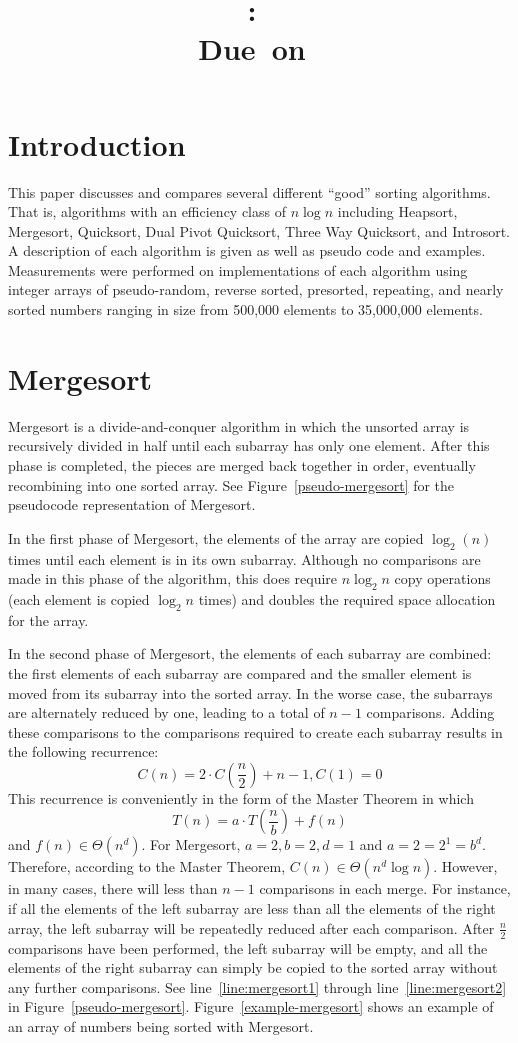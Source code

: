 \documentclass{article}
\title{
    \vspace{2in}
    \textmd{\textbf{\hmwkClass:\ \hmwkTitle}}\\
    \normalsize\vspace{0.1in}\small{Due\ on\ \hmwkDueDate}\\
    \vspace{0.1in}\large{\textit{\hmwkClassInstructor}}
    \vspace{3in}
}
\author{\textbf{\hmwkAuthorName}}
\begin{document}
\section{Introduction}
This paper discusses and compares several different ``good'' sorting
algorithms. That is, algorithms with an efficiency class of $n\log n$
including Heapsort, Mergesort, Quicksort, Dual Pivot Quicksort,
Three Way Quicksort, and Introsort. A description of each algorithm is
given as well as pseudo code and examples. Measurements were performed
on implementations of each algorithm using integer arrays of pseudo-random,
reverse sorted, presorted, repeating, and nearly sorted numbers ranging
in size from 500,000 elements to 35,000,000 elements.

\section{Mergesort}
Mergesort is a divide-and-conquer algorithm in which the unsorted array is recursively divided
in half until each subarray has only one element. After this phase is completed, the pieces are 
merged back together in order, eventually recombining into one sorted array. See 
Figure~\ref{pseudo-mergesort} for the pseudocode representation of Mergesort.

In the first phase of Mergesort, the elements of the array are copied $\log_2(n)$ times until each 
element is in its own subarray. Although no comparisons are made in this phase of the algorithm,
this does require $n\log_2 n$ copy operations (each element is copied $\log_2n$ times) 
and doubles the required space allocation for the array.

In the second phase of Mergesort, the elements of each subarray are combined: the first elements of each subarray are compared and the smaller element is moved from its subarray into the sorted array. In the worse case, the subarrays are alternately reduced by one, leading to a total of $n-1$
comparisons. Adding these comparisons to the comparisons required to create each subarray 
results in the following recurrence:
\[
	C(n) = 2 \cdot C\left(\frac{n}{2}\right) + n-1, C(1) = 0
\]
This recurrence is conveniently in the form of the Master Theorem in which
\[
	T(n) = a \cdot T\left(\frac{n}{b}\right) +f(n)
\]
and $f(n) \in \Theta(n^d)$. For Mergesort, $a = 2, b = 2, d = 1$ and $a = 2 = 2^1 = b^d$. 
Therefore, according to the Master Theorem, $C(n) \in \Theta(n^d \log n)$. However, in many
cases, there will less than $n-1$ comparisons in each merge. For instance, if
all the elements of the left subarray are less than all the elements of the right array, the left
subarray will be repeatedly reduced after each comparison. After $\frac{n}{2}$ comparisons 
have been performed, the left subarray will be empty, and all the elements of the right subarray 
can simply be copied to the sorted array without any further comparisons. 
See line~\ref{line:mergesort1} through line~\ref{line:mergesort2} in Figure~\ref{pseudo-mergesort}.
Figure~\ref{example-mergesort} shows an example of an array of numbers being sorted with Mergesort.
\end{document}
